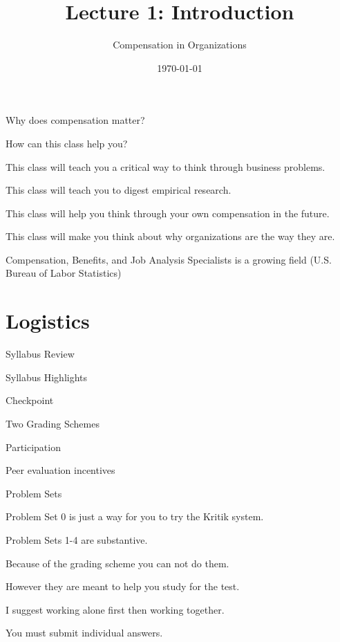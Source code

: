 \documentclass[aspectratio=169,usenames,dvipsnames]{beamer}
\title[diss]{Lecture 1: Introduction} %
\author{Compensation in Organizations} %
\institute[shortinst]{Jacob Kohlhepp}
\date{\today} %
\newenvironment{wideitemize}{\itemize\addtolength{\itemsep}{10pt}}{\enditemize}
\begin{document}
\begin{frame}
\titlepage %

\end{frame}


\begin{frame}
\centering
    \huge Why does compensation matter?
\end{frame}

\begin{frame}{How can this class help you?}

\begin{wideitemize}
    \item This class will teach you a critical way to think through business problems.
    \item This class will teach you to digest empirical research.
    \item This class will help you think through your own compensation in the future.
    \item This class will make you think about why organizations are the way they are.
    \item Compensation, Benefits, and Job Analysis Specialists is a growing field (U.S. Bureau of Labor Statistics)
\end{wideitemize}

\end{frame}


\section{Logistics}

\begin{frame}
\centering
    \huge Syllabus Review
\end{frame}

\begin{frame}{Syllabus Highlights}
\begin{wideitemize}
    \item Checkpoint
    \item Two Grading Schemes
    \item Participation
    \item Peer evaluation incentives
\end{wideitemize}
\end{frame}

\begin{frame}{Problem Sets}

\begin{wideitemize}
    \item Problem Set 0 is just a way for you to try the Kritik system.
    \item Problem Sets 1-4 are substantive.
    \item Because of the grading scheme you can not do them.
    \item However they are meant to help you study for the test.
    \item I suggest working alone first then working together.
    \item You must submit individual answers.
\end{wideitemize}
    
\end{frame}
\end{document}
